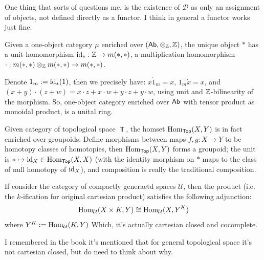 \documentclass{article}
\begin{document}
One thing that sorts of questions me, is the existence of $\mathcal{D}$ as only an assignment of objects, not defined directly as a functor. I think in general a functor works just fine.

\hfil

\begin{exmp}
    Given a one-object category $\mu$ enriched over $(\mathsf{Ab},\otimes_{\mathbb{Z}},\mathbb{Z})$, the unique object $*$ has a unit homomorphism $\mathrm{id}_*:\mathbb{Z}\rightarrow m(*,*)$, a multiplication homomorphism $\cdot:m(*,*)\otimes_{\mathbb{Z}} m(*,*)\rightarrow m(*,*)$. 

    Denote $1_m:=\mathrm{id}_* (1)$, then we precisely have: $x\dot 1_m=x$, $1_m\dot x=x$, and $(x+y)\cdot (z+w)=x\cdot z+x\cdot w+y\cdot z+y\cdot w$, using unit and $\mathbb{Z}$-bilinearity of the morphism. So, one-object category enriched over $\mathsf{Ab}$ with tensor product as monoidal product, is a unital ring.
\end{exmp}

\begin{exmp}
    Given category of topological space $\Top$, the homset $\mathrm{Hom}_{\mathsf{Top}} (X,Y)$ is in fact enriched over groupoids: Define morphisms between maps $f,g:X\rightarrow Y$ to be homotopy classes of homotopies, then $\mathrm{Hom}_{\mathsf{Top}} (X,Y)$ forms a groupoid; the unit is $*\mapsto \mathrm{id}_X\in\mathrm{Hom}_{\mathsf{Top}} (X,X)$ (with the identity morphism on $*$ maps to the class of null homotopy of $\mathrm{id}_X$), and composition is really the traditional composition.
\end{exmp}

\begin{exmp}
    If consider the category of compactly generaetd spaces $\mathcal{U}$, then the product (i.e. the $k$-ification for original cartesian product) satisfies the following adjunction:
    \[\mathrm{Hom}_\mathcal{U}(X\times K,Y)\cong \mathrm{Hom}_\mathcal{U}(X,Y^K)\]
    where $Y^K:=\mathrm{Hom}_\mathcal{U}(K,Y)$
    Which, it's actually cartesian closed and cocomplete.
\end{exmp}

I remembered in the book it's mentioned that for general topological space it's not cartesian closed, but do need to think about why.
\end{document}
